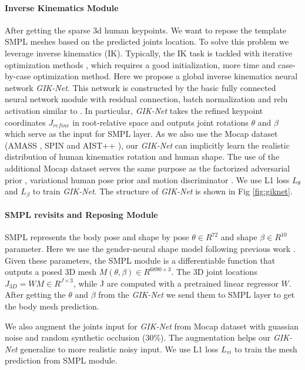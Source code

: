 \documentclass[10pt,twocolumn,letterpaper]{article}
\begin{document}
\paragraph{Inverse Kinematics Module} After getting the sparse 3d human keypoints. We want to repose the template SMPL meshes based on the predicted joints location. To solve this problem we leverage inverse kinematics (IK).  Typically, the IK task is tackled with iterative optimization methods \cite{ik1,ik2,ik3}, which requires a good initialization, more time and case-by-case optimization method. Here we propose a global inverse kinematics neural network  \textit{GIK-Net}. This network is constructed by the basic fully connected neural network module with residual connection, batch normalization and relu activation similar to \cite{simple}. In particular, \textit{GIK-Net} takes the refined keypoint coordinates  $J_{refine}$ in root-relative space and outputs joint rotations $\theta$ and $\beta$ which serve as the input for SMPL layer. As we also use the Mocap dataset (AMASS \cite{AMASS:ICCV:2019}, SPIN\cite{spin} and AIST++ \cite{aist++}), our \textit{GIK-Net} can implicitly learn the realistic distribution of human kinematics rotation and human shape. The use of the additional Mocap dataset serves the same purpose as the factorized adversarial prior \cite{HMR}, variational human pose prior \cite{SMPL-X:2019} and motion discriminator \cite{kocabas2019vibe}. We use L1 loss $L_{\theta}$  and $L_{\beta}$ to train \textit{GIK-Net}. The structure of \textit{GIK-Net} is shown in Fig \ref{fig:giknet}.


\paragraph{SMPL revisits and Reposing Module} SMPL \cite{smpl} represents the body pose and shape by pose $\theta\in R^{72}$ and shape $\beta\in R^{10}$ parameter. Here we use the gender-neural shape model following previous work \cite{pare,HMR,spin}. Given these parameters, the SMPL module is a differentiable function that outputs a posed 3D mesh $M(\theta,\beta) \in R^{6890 \times 3}$. The 3D joint locations $J_{3D} = WM \in R^{J \times 3}$, while J are computed with a pretrained linear regressor $W$.
After getting the $\theta$ and $\beta$ from the  \textit{GIK-Net} we send them to SMPL layer to get the body mesh prediction.  

We also augment  the joints input for \textit{GIK-Net} from Mocap dataset with guassian noise and random synthetic occlusion (30\%). The augmentation helps our \textit{GIK-Net} generalize to more realistic noisy input.
We use L1 loss  $L_{vi}$ to train the mesh prediction from SMPL module.
\end{document}
